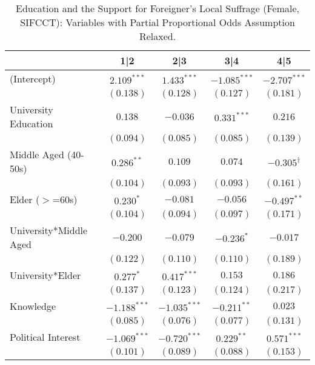 
\begin{table}
\caption{Education and the Support for Foreigner's Local Suffrage (Female, SIFCCT): Variables with Partial Proportional Odds Assumption Relaxed.}
\begin{center}
\begin{tabular}{l c c c c }
\toprule
 & 1|2 & 2|3 & 3|4 & 4|5 \\
\midrule
(Intercept)            & $2.109^{***}$  & $1.433^{***}$      & $-1.085^{***}$ & $-2.707^{***}$     \\
                       & $(0.138)$      & $(0.128)$          & $(0.127)$      & $(0.181)$          \\
University Education   & $0.138$        & $-0.036$           & $0.331^{***}$  & $0.216$            \\
                       & $(0.094)$      & $(0.085)$          & $(0.085)$      & $(0.139)$          \\
Middle Aged (40-50s)   & $0.286^{**}$   & $0.109$            & $0.074$        & $-0.305^{\dagger}$ \\
                       & $(0.104)$      & $(0.093)$          & $(0.093)$      & $(0.161)$          \\
Elder ($>$=60s)        & $0.230^{*}$    & $-0.081$           & $-0.056$       & $-0.497^{**}$      \\
                       & $(0.104)$      & $(0.094)$          & $(0.097)$      & $(0.171)$          \\
University*Middle Aged & $-0.200$       & $-0.079$           & $-0.236^{*}$   & $-0.017$           \\
                       & $(0.122)$      & $(0.110)$          & $(0.110)$      & $(0.189)$          \\
University*Elder       & $0.277^{*}$    & $0.417^{***}$      & $0.153$        & $0.186$            \\
                       & $(0.137)$      & $(0.123)$          & $(0.124)$      & $(0.217)$          \\
Knowledge              & $-1.188^{***}$ & $-1.035^{***}$     & $-0.211^{**}$  & $0.023$            \\
                       & $(0.085)$      & $(0.076)$          & $(0.077)$      & $(0.131)$          \\
Political Interest     & $-1.069^{***}$ & $-0.720^{***}$     & $0.229^{**}$   & $0.571^{***}$      \\
                       & $(0.101)$      & $(0.089)$          & $(0.088)$      & $(0.153)$          \\

\end{tabular}
\end{center}
\end{table}

